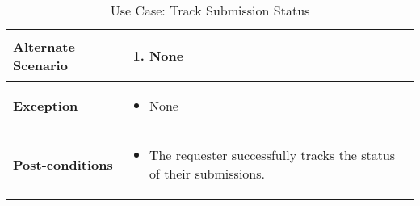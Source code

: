 \begin{table}[!ht]
\begin{tabularx}{\textwidth}{|l|X|}
        \hline
        \textbf{Alternate Scenario} & 
        \begin{enumerate}[label=\arabic*.,itemsep=0pt]
            \item None
        \end{enumerate} \\
        \hline
        \textbf{Exception} & 
        \begin{itemize}[label=--,itemsep=0pt]
            \item None
        \end{itemize} \\
        \hline
        \textbf{Post-conditions} & 
        \begin{itemize}[label=--,itemsep=0pt]
            \item The requester successfully tracks the status of their submissions.
        \end{itemize} \\
        \hline
    \end{tabularx}
    \caption{Use Case: Track Submission Status}
    \label{tab:use-case-register}
\end{table}

